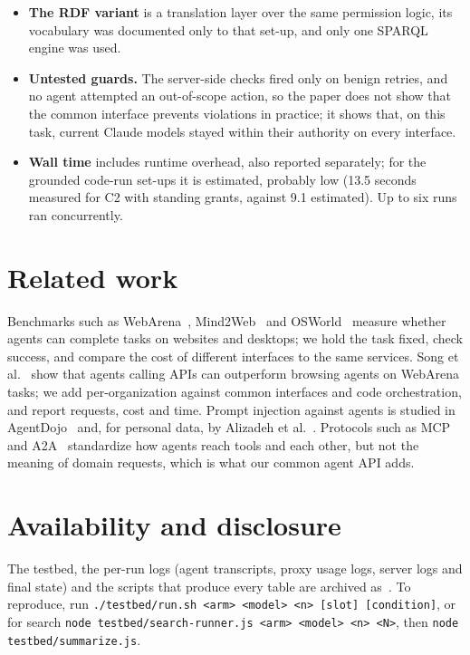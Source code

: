 \documentclass[11pt]{article}
\begin{document}
\begin{itemize}
\item \textbf{The RDF variant} is a translation layer over the same permission logic, its vocabulary was documented only to that set-up, and only one SPARQL engine was used.
\item \textbf{Untested guards.} The server-side checks fired only on benign retries, and no agent attempted an out-of-scope action, so the paper does not show that the common interface prevents violations in practice; it shows that, on this task, current Claude models stayed within their authority on every interface.
\item \textbf{Wall time} includes runtime overhead, also reported separately; for the grounded code-run set-ups it is estimated, probably low (13.5 seconds measured for C2 with standing grants, against 9.1 estimated). Up to six runs ran concurrently.
\end{itemize}

\section{Related work}

Benchmarks such as WebArena~\cite{webarena}, Mind2Web~\cite{mind2web} and OSWorld~\cite{osworld} measure whether agents can complete tasks on websites and desktops; we hold the task fixed, check success, and compare the cost of different interfaces to the same services. Song et al.~\cite{beyondbrowsing} show that agents calling APIs can outperform browsing agents on WebArena tasks; we add per-organization against common interfaces and code orchestration, and report requests, cost and time. Prompt injection against agents is studied in AgentDojo~\cite{agentdojo} and, for personal data, by Alizadeh et al.~\cite{alizadeh}. Protocols such as MCP~\cite{mcp} and A2A~\cite{a2a} standardize how agents reach tools and each other, but not the meaning of domain requests, which is what our common agent API adds.

\section{Availability and disclosure}

\begin{sloppypar}
The testbed, the per-run logs (agent transcripts, proxy usage logs, server logs and final state) and the scripts that produce every table are archived as~\cite{artifact}. To reproduce, run \texttt{./testbed/run.sh <arm> <model> <n> [slot] [condition]}, or for search \texttt{node testbed/search-runner.js <arm> <model> <n> <N>}, then \texttt{node testbed/summarize.js}.
\end{sloppypar}
\end{document}
